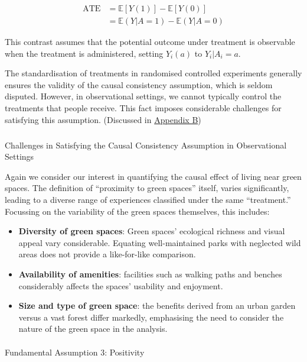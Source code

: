 \documentclass[
  singlecolumn]{article}
\makeatletter
\let\oldparagraph\paragraph
\renewcommand{\paragraph}{
    \@ifstar
      \xxxParagraphStar
      \xxxParagraphNoStar
  }
\newcommand{\xxxParagraphStar}[1]{\oldparagraph*{#1}\mbox{}}
\newcommand{\xxxParagraphNoStar}[1]{\oldparagraph{#1}\mbox{}}
\let\oldsubparagraph\subparagraph
\renewcommand{\subparagraph}{
    \@ifstar
      \xxxSubParagraphStar
      \xxxSubParagraphNoStar
  }
\newcommand{\xxxSubParagraphStar}[1]{\oldsubparagraph*{#1}\mbox{}}
\newcommand{\xxxSubParagraphNoStar}[1]{\oldsubparagraph{#1}\mbox{}}
\providecommand{\tightlist}{%
  \setlength{\itemsep}{0pt}\setlength{\parskip}{0pt}}\usepackage{longtable,booktabs,array}
\makeatother
\begin{document}
\[
\begin{aligned}
\text{ATE} &= \mathbb{E}[Y(1)] - \mathbb{E}[Y(0)] \\
&= \mathbb{E}(Y|A=1) - \mathbb{E}(Y|A=0)
\end{aligned}
\]

This contrast assumes that the potential outcome under treatment is
observable when the treatment is administered, setting \(Y_i(a)\) to
\(Y_i|A_i=a\).

The standardisation of treatments in randomised controlled experiments
generally ensures the validity of the causal consistency assumption,
which is seldom disputed. However, in observational settings, we cannot
typically control the treatments that people receive. This fact imposes
considerable challenges for satisfying this assumption. (Discussed in
\hyperref[appendix-b]{Appendix B})

\subparagraph{Challenges in Satisfying the Causal Consistency Assumption
in Observational
Settings}\label{challenges-in-satisfying-the-causal-consistency-assumption-in-observational-settings}

Again we consider our interest in quantifying the causal effect of
living near green spaces. The definition of ``proximity to green
spaces'' itself, varies significantly, leading to a diverse range of
experiences classified under the same ``treatment.'' Focussing on the
variability of the green spaces themselves, this includes:

\begin{itemize}
\tightlist
\item
  \textbf{Diversity of green spaces}: Green spaces' ecological richness
  and visual appeal vary considerable. Equating well-maintained parks
  with neglected wild areas does not provide a like-for-like comparison.
\item
  \textbf{Availability of amenities}: facilities such as walking paths
  and benches considerably affects the spaces' usability and enjoyment.
\item
  \textbf{Size and type of green space}: the benefits derived from an
  urban garden versus a vast forest differ markedly, emphasising the
  need to consider the nature of the green space in the analysis.
\end{itemize}

\paragraph{Fundamental Assumption 3:
Positivity}\label{fundamental-assumption-3-positivity}
\end{document}
